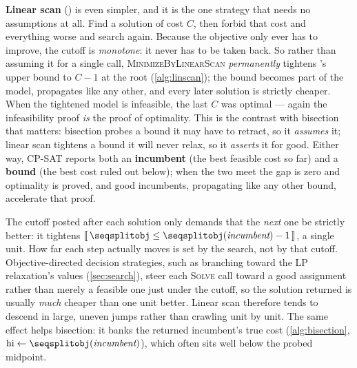 \textbf{Linear scan} () is even simpler, and it is the
one strategy that needs no assumptions at all. Find a solution of cost $C$, then forbid that cost and
everything worse and search again. Because the objective only ever has to improve,
the cutoff is \emph{monotone}: it never has to be taken back. So rather than
assuming it for a single call, \textsc{MinimizeByLinearScan} \emph{permanently}
tightens 's upper bound to $C - 1$ at the root
(\cref{alg:linscan}); the bound becomes part of the model, propagates like
any other, and every later solution is strictly cheaper. When the tightened model
is infeasible, the last $C$ was optimal --- again the infeasibility proof \emph{is}
the proof of optimality. This is the contrast with bisection that matters: bisection
probes a bound it may have to retract, so it \emph{assumes} it; linear scan tightens
a bound it will never relax, so it \emph{asserts} it for good. Either way, CP-SAT
reports both an \textbf{incumbent} (the best feasible cost so far) and a
\textbf{bound} (the best cost ruled out below); when the two meet the gap is zero
and optimality is proved, and good incumbents, propagating like any other bound,
accelerate that proof.

\begin{platypusinfo}
The cutoff posted after each solution only demands that the \emph{next} one be
strictly better: it tightens $\bl{\, \code{obj} \le \code{obj}(\textit{incumbent}) - 1 \,}$,
a single unit. How far each step actually moves is set by the search, not by that
cutoff. Objective-directed decision strategies, such as branching toward the LP
relaxation's values (\cref{sec:search}), steer each \textsc{Solve} call toward a
good assignment rather than merely a feasible one just under the cutoff, so the
solution returned is usually \emph{much} cheaper than one unit better. Linear scan
therefore tends to descend in large, uneven jumps rather than crawling unit by
unit. The same effect helps bisection: it banks the returned incumbent's true cost
(\cref{alg:bisection}, $\text{hi} \gets \code{obj}(\textit{incumbent})$), which
often sits well below the probed midpoint.
\end{platypusinfo}

